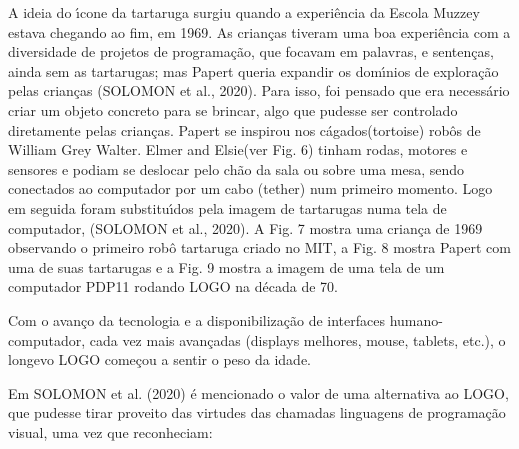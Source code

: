 \documentclass[
12pt,		%
openright,	%
twoside,  %
a4paper,			%
chapter=TITLE,		%
english,			%
french,				%
spanish,			%
brazil				%
]{USPSC-classe/USPSC}
\begin{document}
A ideia do \'{\i}cone da tartaruga surgiu quando a experi\^encia da Escola Muzzey estava chegando ao fim, em 1969. As crian\c{c}as tiveram uma boa experi\^encia com a diversidade de projetos de programa\c{c}\~ao, que focavam em palavras, e senten\c{c}as, ainda sem as tartarugas; mas Papert queria expandir os dom\'{\i}nios de explora\c{c}\~ao pelas crian\c{c}as (SOLOMON et al., 2020). Para isso, foi pensado que era necess\'ario criar um objeto concreto para se brincar, algo que pudesse ser controlado diretamente pelas crian\c{c}as. Papert se inspirou nos \textquotedbl c\'agados\textquotedbl   (tortoise) rob\^os de William Grey Walter. \textquotedbl Elmer and Elsie\textquotedbl  (ver Fig. 6) tinham rodas, motores e sensores e podiam se deslocar pelo ch\~ao da sala ou sobre uma mesa, sendo conectados ao computador por um cabo (tether) num primeiro momento. Logo em seguida foram substitu\'{\i}dos pela imagem de tartarugas numa tela de computador, (SOLOMON et al., 2020). A Fig. 7 mostra uma crian\c{c}a de 1969 observando o primeiro rob\^o tartaruga criado no MIT, a Fig. 8 mostra Papert com uma de suas tartarugas e a Fig. 9 mostra a imagem de uma tela de um computador PDP11 rodando LOGO na d\'ecada de 70.

















Com o avan\c{c}o da tecnologia e a disponibiliza\c{c}\~ao de interfaces humano-computador, cada vez mais avan\c{c}adas (displays melhores, mouse, tablets, etc.), o longevo LOGO come\c{c}ou a sentir o peso da idade.

















Em SOLOMON et al. (2020) \'e mencionado o valor de uma alternativa ao LOGO, que pudesse tirar proveito das virtudes das chamadas \textquotedbl linguagens de programa\c{c}\~ao visual\textquotedbl , uma vez que reconheciam:
\end{document}
